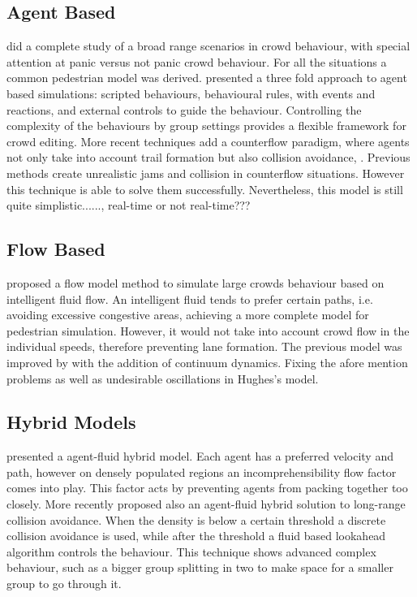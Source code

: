 \documentclass[6pt]{article} %
\begin{document}
\begin{multicols}{2}
\subsection{Agent Based}

\cite{helbing2002} did a complete study of a broad range scenarios in crowd behaviour, with special attention at panic versus not panic crowd behaviour.
For all the situations a common pedestrian model was derived.
\cite{raupp2001} presented a three fold approach to agent based simulations: scripted behaviours, behavioural rules, with events and reactions, and external controls to guide the behaviour.
Controlling the complexity of the behaviours by group settings provides a flexible framework for crowd editing.
More recent techniques add a counterflow paradigm, where agents not only take into account trail formation but also collision avoidance, \cite{heliovaara2012}.
Previous methods create unrealistic jams and collision in counterflow situations.
However this technique is able to solve them successfully.
Nevertheless, this model is still quite simplistic......, real-time or not real-time???

\subsection{Flow Based}

\cite{hughes2003} proposed a flow model method to simulate large crowds behaviour based on intelligent fluid flow.
An intelligent fluid tends to prefer certain paths, i.e. avoiding excessive congestive areas, achieving a more complete model for pedestrian simulation.
However, it would not take into account crowd flow in the individual speeds, therefore preventing lane formation. 
The previous model was improved by \cite{treuille2006} with the addition of continuum dynamics.
Fixing the afore mention problems as well as undesirable oscillations in Hughes's model. 

\subsection{Hybrid Models}

\cite{Narain2009} presented a agent-fluid hybrid model.
Each agent has a preferred velocity and path, however on densely populated regions an incomprehensibility flow factor comes into play.
This factor acts by preventing agents from packing together too closely.
More recently \cite{lin2014} proposed also an agent-fluid hybrid solution to long-range collision avoidance.
When the density is below a certain threshold a discrete collision avoidance is used,
while after the threshold a fluid based lookahead algorithm controls the behaviour.
This technique shows advanced complex behaviour, such as a bigger group splitting in two to make space for a smaller group to go through it.


\end{multicols}
\end{document}
